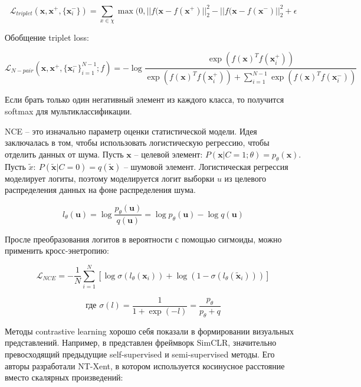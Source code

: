\documentclass[a4paper, 12pt]{article}
\begin{document}
\begin{equation}
    \mathcal{L}_{triplet}(\textbf{x}, \textbf{x}^+, \{\textbf{x}_i^-\}) = \sum\limits_{x \in \chi}\max(0, ||f(\textbf{x} - f(\textbf{x}^+)||_2^2 - ||f(\textbf{x} - f(\textbf{x}^-)||_2^2 + \epsilon
\end{equation}

Обобщение triplet loss:

\begin{equation}\label{eq:103}
    \mathcal{L}_{N-pair}(\textbf{x}, \textbf{x}^+, \{\textbf{x}_i^-\}_{i=1}^{N-1}; f) = - \log \frac{\exp(f(\textbf{x})^T f(\textbf{x}_i^+))}{\exp(f(\textbf{x})^T f(\textbf{x}_i^+)) + \sum _{i=1}^{N-1} \exp(f(\textbf{x})^Tf(\textbf{x}_i^-))}
\end{equation}

Если брать только один негативный элемент из каждого класса, то получится softmax для мультиклассификации.

NCE -- это изначально параметр оценки статистической модели. Идея заключалась в том, чтобы использовать логистическую регрессию, чтобы отделить данных от шума. Пусть $\mathbf{x}$ -- целевой элемент: $P(\mathbf{x} | C = 1; \theta) = p_{\theta}(\mathbf{x})$. Пусть $\tilde x: ~ P(\mathbf{\tilde x} | C = 0) = q(\mathbf{\tilde x})$ -- шумовой элемент. Логистическая регрессия моделирует логиты, поэтому моделируется логит выборки $u$ из целевого распределения данных на фоне распределения шума.

\begin{equation}
    l_{\theta}(\mathbf{u}) = \log \frac{p_{\theta}(\mathbf{u})}{q(\mathbf{u})} = \log p_{\theta}(\mathbf{u}) - \log q(\mathbf{u})
\end{equation}

Просле преобразования логитов в вероятности с помощью сигмоиды, можно применить кросс-энетропию:

\begin{equation}
    \mathcal{L}_{NCE} = - \frac{1}{N} \sum\limits_{i = 1}^N[\log \sigma(l_{\theta}(\mathbf{x}_i)) + \log (1 - \sigma(l_{\theta}(\mathbf{\tilde x}_i)))]
\end{equation}

\[\text{где } \sigma(l) = \frac{1}{1 + \exp(-l)} = \frac{p_{\theta}}{p_{\theta} + q}\]

Методы contrastive learning хорошо себя показали в формировании визуальных представлений. Например, в \citep{chen2020simple} представлен фреймворк SimCLR, значительно превосходящий предыдущие self-supervised и semi-supervised методы. Его авторы разработали NT-Xent, в котором используется косинусное расстояние вместо скалярных произведений:
\end{document}
